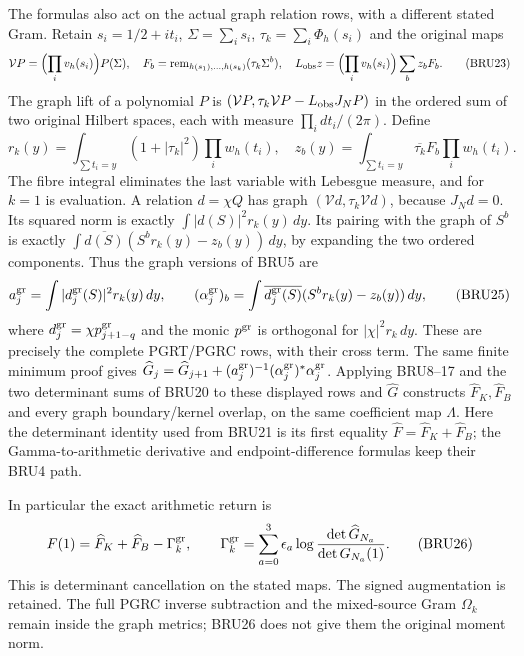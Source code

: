The formulas also act on the actual graph relation rows, with a
different stated Gram. Retain $s_i=1/2+it_i$, $\Sigma=\sum_i s_i$,
$\tau_k=\sum_i\Phi_h(s_i)$ and the original maps
\[
 \mathcal VP=\Bigl(\prod_i v_h(s_i)\Bigr)P(\Sigma),\quad
 F_b=\operatorname{rem}_{h(s_1),\ldots,h(s_k)}(\tau_k\Sigma^b),\quad
 L_{\rm obs}z=\Bigl(\prod_i v_h(s_i)\Bigr)\sum_bz_bF_b .
 \tag{BRU23}
\]
The graph lift of a polynomial $P$ is
$(\mathcal VP,\tau_k\mathcal VP-L_{\rm obs}J_NP)$ in the ordered
sum of two original Hilbert spaces, each with measure
$\prod_i dt_i/(2\pi)$. Define
\[
 r_k(y)=\int_{\sum t_i=y}(1+|\tau_k|^2)\prod_i w_h(t_i),\quad
 z_b(y)=\int_{\sum t_i=y}\overline{\tau_k}F_b\prod_iw_h(t_i).
 \tag{BRU24}
\]
The fibre integral eliminates the last variable with Lebesgue
measure, and for $k=1$ is evaluation. A relation $d=\chi Q$ has
graph $(\mathcal Vd,\tau_k\mathcal Vd)$, because $J_Nd=0$.
Its squared norm is exactly $\int|d(S)|^2r_k(y)\,dy$.
Its pairing with the graph of $S^b$ is exactly
$\int\overline{d(S)}(S^b r_k(y)-z_b(y))\,dy$, by expanding
the two ordered components. Thus the graph versions of BRU5 are
\[
 a_j^{\rm gr}=\int|d_j^{\rm gr}(S)|^2r_k(y)\,dy,\qquad
 (\alpha_j^{\rm gr})_b=
 \int\overline{d_j^{\rm gr}(S)}(S^b r_k(y)-z_b(y))\,dy,
 \tag{BRU25}
\]
where $d_j^{\rm gr}=\chi p_{j+1-q}^{\rm gr}$ and the monic
$p^{\rm gr}$ is orthogonal for $|\chi|^2r_k\,dy$.
These are precisely the complete PGRT/PGRC rows, with their cross
term. The same finite minimum proof gives
$\widehat G_j=\widehat G_{j+1}
+(a_j^{\rm gr})^{-1}(\alpha_j^{\rm gr})^*\alpha_j^{\rm gr}$.
Applying BRU8--17 and the two determinant sums of BRU20 to
these displayed rows and $\widehat G$
constructs $\widehat F_K,\widehat F_B$ and every graph boundary/kernel
overlap, on the same coefficient map $\Lambda$.
Here the determinant identity used from BRU21 is its first equality
$\widehat F=\widehat F_K+\widehat F_B$; the Gamma-to-arithmetic
derivative and endpoint-difference formulas keep their BRU4 path.

In particular the exact arithmetic return is
\[
 F(1)=\widehat F_K+\widehat F_B-\Gamma_k^{\rm gr},\qquad
 \Gamma_k^{\rm gr}=\sum_{a=0}^3\epsilon_a
                   \log\frac{\det\widehat G_{N_a}}{\det G_{N_a}(1)}.
 \tag{BRU26}
\]
This is determinant cancellation on the stated maps. The signed
augmentation is retained. The full PGRC inverse subtraction and
the mixed-source Gram $\Omega_k$ remain inside the graph metrics;
BRU26 does not give them the original moment norm.

